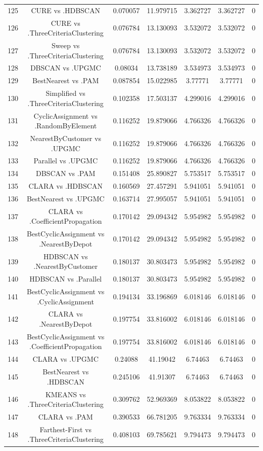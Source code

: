 \documentclass[a4paper,10pt]{article}
\begin{document}
\begin{landscape}
\begin{table}[!htp]
\begin{tabular}{ccccccc}
125&CURE vs .HDBSCAN&0.070057&11.979715&3.362727&3.362727&0\\
126&CURE vs .ThreeCriteriaClustering&0.076784&13.130093&3.532072&3.532072&0\\
127&Sweep vs .ThreeCriteriaClustering&0.076784&13.130093&3.532072&3.532072&0\\
128&DBSCAN vs .UPGMC&0.08034&13.738189&3.534973&3.534973&0\\
129&BestNearest vs .PAM&0.087854&15.022985&3.77771&3.77771&0\\
130&Simplified vs .ThreeCriteriaClustering&0.102358&17.503137&4.299016&4.299016&0\\
131&CyclicAssignment vs .RandomByElement&0.116252&19.879066&4.766326&4.766326&0\\
132&NearestByCustomer vs .UPGMC&0.116252&19.879066&4.766326&4.766326&0\\
133&Parallel vs .UPGMC&0.116252&19.879066&4.766326&4.766326&0\\
134&DBSCAN vs .PAM&0.151408&25.890827&5.753517&5.753517&0\\
135&CLARA vs .HDBSCAN&0.160569&27.457291&5.941051&5.941051&0\\
136&BestNearest vs .UPGMC&0.163714&27.995057&5.941051&5.941051&0\\
137&CLARA vs .CoefficientPropagation&0.170142&29.094342&5.954982&5.954982&0\\
138&BestCyclicAssignment vs .NearestByDepot&0.170142&29.094342&5.954982&5.954982&0\\
139&HDBSCAN vs .NearestByCustomer&0.180137&30.803473&5.954982&5.954982&0\\
140&HDBSCAN vs .Parallel&0.180137&30.803473&5.954982&5.954982&0\\
141&BestCyclicAssignment vs .CyclicAssignment&0.194134&33.196869&6.018146&6.018146&0\\
142&CLARA vs .NearestByDepot&0.197754&33.816002&6.018146&6.018146&0\\
143&BestCyclicAssignment vs .CoefficientPropagation&0.197754&33.816002&6.018146&6.018146&0\\
144&CLARA vs .UPGMC&0.24088&41.19042&6.74463&6.74463&0\\
145&BestNearest vs .HDBSCAN&0.245106&41.91307&6.74463&6.74463&0\\
146&KMEANS vs .ThreeCriteriaClustering&0.309762&52.969369&8.053822&8.053822&0\\
147&CLARA vs .PAM&0.390533&66.781205&9.763334&9.763334&0\\
148&Farthest-First vs .ThreeCriteriaClustering&0.408103&69.785621&9.794473&9.794473&0\\

\end{tabular}
\end{table}
\end{landscape}
\end{document}
